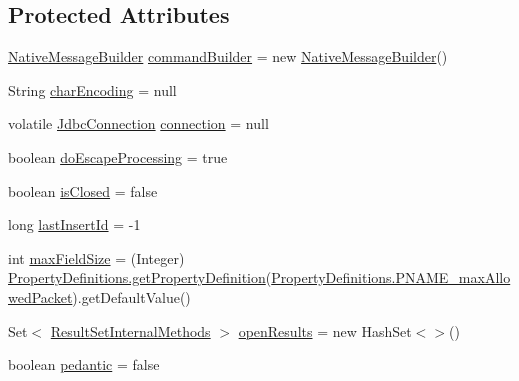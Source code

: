 \subsection*{Protected Attributes}
\begin{DoxyCompactItemize}
\item 
\mbox{\hyperlink{classcom_1_1mysql_1_1cj_1_1protocol_1_1a_1_1_native_message_builder}{Native\+Message\+Builder}} \mbox{\hyperlink{classcom_1_1mysql_1_1cj_1_1jdbc_1_1_statement_impl_a22d76e354be8de4952f86504a3433251}{command\+Builder}} = new \mbox{\hyperlink{classcom_1_1mysql_1_1cj_1_1protocol_1_1a_1_1_native_message_builder}{Native\+Message\+Builder}}()
\item 
String \mbox{\hyperlink{classcom_1_1mysql_1_1cj_1_1jdbc_1_1_statement_impl_a013d9c1b743d83cb092f7175327a8455}{char\+Encoding}} = null
\item 
volatile \mbox{\hyperlink{interfacecom_1_1mysql_1_1cj_1_1jdbc_1_1_jdbc_connection}{Jdbc\+Connection}} \mbox{\hyperlink{classcom_1_1mysql_1_1cj_1_1jdbc_1_1_statement_impl_a0d65d87b997eec0472cc8f07f376cfe0}{connection}} = null
\item 
boolean \mbox{\hyperlink{classcom_1_1mysql_1_1cj_1_1jdbc_1_1_statement_impl_af7455e23bee0b1db4c8b8aa1a94f5412}{do\+Escape\+Processing}} = true
\item 
boolean \mbox{\hyperlink{classcom_1_1mysql_1_1cj_1_1jdbc_1_1_statement_impl_a5bdc6952f3179144fc55b513bed5a5d7}{is\+Closed}} = false
\item 
long \mbox{\hyperlink{classcom_1_1mysql_1_1cj_1_1jdbc_1_1_statement_impl_a68a8e8c2a5616f548cc9152817fb0459}{last\+Insert\+Id}} = -\/1
\item 
int \mbox{\hyperlink{classcom_1_1mysql_1_1cj_1_1jdbc_1_1_statement_impl_a355103d25d6487623132cf8d0c64c9ab}{max\+Field\+Size}} = (Integer) \mbox{\hyperlink{classcom_1_1mysql_1_1cj_1_1conf_1_1_property_definitions_afd49a84fa2e960cf885e7925aa9d0157}{Property\+Definitions.\+get\+Property\+Definition}}(\mbox{\hyperlink{classcom_1_1mysql_1_1cj_1_1conf_1_1_property_definitions_a12f43563b2f4047d96e88f0b90244c83}{Property\+Definitions.\+P\+N\+A\+M\+E\+\_\+max\+Allowed\+Packet}}).get\+Default\+Value()
\item 
Set$<$ \mbox{\hyperlink{interfacecom_1_1mysql_1_1cj_1_1jdbc_1_1result_1_1_result_set_internal_methods}{Result\+Set\+Internal\+Methods}} $>$ \mbox{\hyperlink{classcom_1_1mysql_1_1cj_1_1jdbc_1_1_statement_impl_a812055d2262412bf71c9553cb0e7640c}{open\+Results}} = new Hash\+Set$<$$>$()
\item 
boolean \mbox{\hyperlink{classcom_1_1mysql_1_1cj_1_1jdbc_1_1_statement_impl_a0e2a7c6a67916ad9df5f99e913c85daf}{pedantic}} = false
$$
\end{DoxyCompactItemize}
